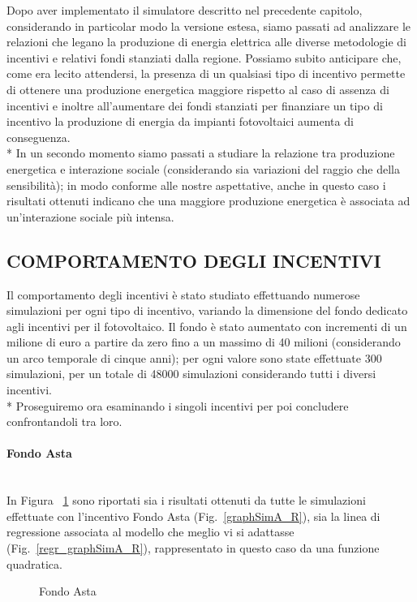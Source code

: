\documentclass[12pt,a4paper,openright,twoside]{report}
\newcommand{\myparagraph}[1]{\paragraph{#1}\mbox{}\\}
\begin{document}
Dopo aver implementato il simulatore descritto nel precedente capitolo, considerando in particolar modo la versione estesa, siamo passati ad analizzare le relazioni che legano la produzione di energia elettrica alle diverse metodologie di incentivi e relativi fondi stanziati dalla regione. Possiamo subito anticipare che, come era lecito attendersi, la presenza di un qualsiasi tipo di incentivo permette di ottenere una produzione energetica maggiore rispetto al caso di assenza di incentivi e inoltre all'aumentare dei fondi stanziati per finanziare un tipo di incentivo la produzione di energia da impianti fotovoltaici aumenta di conseguenza.\\*
In un secondo momento siamo passati a studiare la relazione tra produzione energetica e interazione sociale (considerando sia variazioni del raggio che della sensibilità); in modo conforme alle nostre aspettative, anche in questo caso i risultati ottenuti indicano che una maggiore produzione energetica è associata ad un'interazione sociale più intensa.


\subsection{COMPORTAMENTO DEGLI INCENTIVI}

Il comportamento degli incentivi è stato studiato effettuando numerose simulazioni per ogni tipo di incentivo, variando la dimensione del fondo dedicato agli incentivi per il fotovoltaico. Il fondo è stato aumentato con incrementi di un milione di euro a partire da zero  fino a un massimo di 40 milioni (considerando un arco temporale di cinque anni); per ogni valore sono state effettuate 300 simulazioni, per un totale di 48000 simulazioni considerando tutti i diversi incentivi.\\*
Proseguiremo ora esaminando i singoli incentivi per poi concludere confrontandoli tra loro.

\myparagraph{Fondo Asta}

In Figura ~\ref{graphSimA} sono riportati sia i risultati ottenuti da tutte le simulazioni effettuate con l'incentivo Fondo Asta (Fig.~\ref{graphSimA_R}), sia la linea di regressione associata al modello che meglio vi si adattasse (Fig.~\ref{regr_graphSimA_R}), rappresentato in questo caso da una funzione quadratica.

\begin{figure}[H]
	\centering
	\qquad
	\caption{Fondo Asta}
	\label{graphSimA}
\end{figure}
\end{document}
